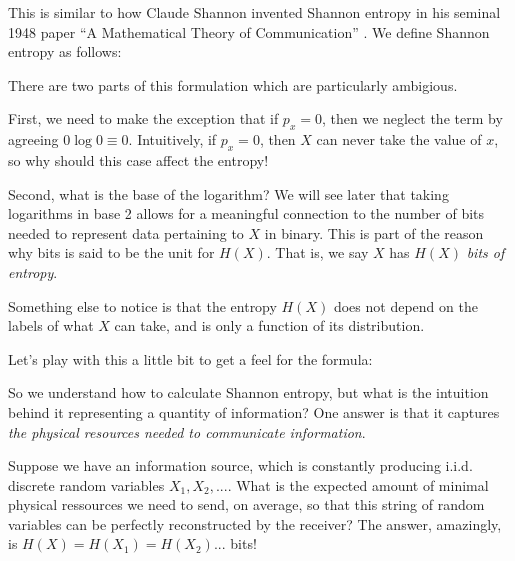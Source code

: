 \documentclass[a4paper,12pt]{article}
\begin{document}
This is similar to how Claude Shannon invented Shannon entropy in his seminal 1948 paper ``A Mathematical Theory of Communication'' \cite{shannon1948}.
We define Shannon entropy as follows:

There are two parts of this formulation which are particularly ambigious.

First, we need to make the exception that if $p_x=0$, then we neglect the term by agreeing $0\log 0 \equiv 0$.
Intuitively, if $p_x=0$, then $X$ can never take the value of $x$, so why should this case affect the entropy!

Second, what is the base of the logarithm?
We will see later that taking logarithms in base 2 allows for a meaningful connection to the number of bits needed to represent data pertaining to $X$ in binary.
This is part of the reason why bits is said to be the unit for $H(X)$.
That is, we say $X$ has $H(X)$ \emph{bits of entropy}.

Something else to notice is that the entropy $H(X)$ does not depend on the labels of what $X$ can take, and is only a function of its distribution.

Let's play with this a little bit to get a feel for the formula:

So we understand how to calculate Shannon entropy, but what is the intuition behind it representing a quantity of information?
One answer is that it captures \emph{the physical resources needed to communicate information}.

Suppose we have an information source, which is constantly producing i.i.d. discrete random variables $X_1,X_2,...$.
What is the expected amount of minimal physical ressources we need to send, on average, so that this string of random variables can be perfectly reconstructed by the receiver?
The answer, amazingly, is $H(X)=H(X_1)=H(X_2)...$ bits!
\end{document}
